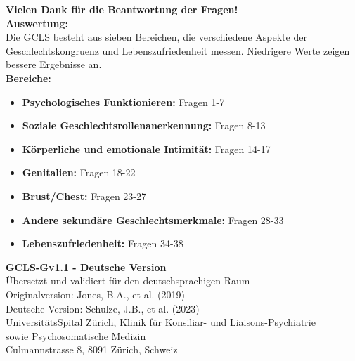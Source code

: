 \documentclass[11pt,a4paper]{article}
\begin{document}
\begin{center}
\begin{tcolorbox}[colback=lightgray,colframe=darkblue,width=\textwidth,arc=3mm]
\centering
\textbf{\large Vielen Dank für die Beantwortung der Fragen!}\\[0.5cm]
\small
\textbf{Auswertung:}\\
Die GCLS besteht aus sieben Bereichen, die verschiedene Aspekte der Geschlechtskongruenz und Lebenszufriedenheit messen. Niedrigere Werte zeigen bessere Ergebnisse an.\\[0.3cm]

\textbf{Bereiche:}
\begin{itemize}[leftmargin=1cm]
    \item \textbf{Psychologisches Funktionieren:} Fragen 1-7
    \item \textbf{Soziale Geschlechtsrollenanerkennung:} Fragen 8-13
    \item \textbf{Körperliche und emotionale Intimität:} Fragen 14-17
    \item \textbf{Genitalien:} Fragen 18-22
    \item \textbf{Brust/Chest:} Fragen 23-27
    \item \textbf{Andere sekundäre Geschlechtsmerkmale:} Fragen 28-33
    \item \textbf{Lebenszufriedenheit:} Fragen 34-38
\end{itemize}
\end{tcolorbox}
\end{center}

\vspace{1cm}

\begin{center}
\footnotesize
\textbf{GCLS-Gv1.1 - Deutsche Version}\\
Übersetzt und validiert für den deutschsprachigen Raum\\
Originalversion: Jones, B.A., et al. (2019)\\
Deutsche Version: Schulze, J.B., et al. (2023)\\[0.3cm]
UniversitätsSpital Zürich, Klinik für Konsiliar- und Liaisons-Psychiatrie\\
sowie Psychosomatische Medizin\\
Culmannstrasse 8, 8091 Zürich, Schweiz
\end{center}
\end{document}
